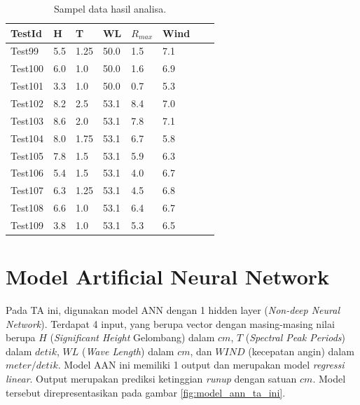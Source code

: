   \begin{table}
      \begin{center}
        \begin{tabular}{|l|l|l|l|l|l|l|l|}
        \hline
        TestId & H & T & WL & $R_{max}$ & Wind \\ \hline
        Test99 & 5.5 & 1.25 & 50.0 & 1.5 & 7.1 \\ \hline
        Test100 & 6.0 & 1.0 & 50.0 & 1.6 & 6.9 \\ \hline
        Test101 & 3.3 & 1.0 & 50.0 & 0.7 & 5.3 \\ \hline
        Test102 & 8.2 & 2.5 & 53.1 & 8.4 & 7.0 \\ \hline
        Test103 & 8.6 & 2.0 & 53.1 & 7.8 & 7.1 \\ \hline
        Test104 & 8.0 & 1.75 & 53.1 & 6.7 & 5.8 \\ \hline
        Test105 & 7.8 & 1.5 & 53.1 & 5.9 & 6.3 \\ \hline
        Test106 & 5.4 & 1.5 & 53.1 & 4.0 & 6.7 \\ \hline
        Test107 & 6.3 & 1.25 & 53.1 & 4.5 & 6.8 \\ \hline
        Test108 & 6.6 & 1.0 & 53.1 & 6.4 & 6.7 \\ \hline
        Test109 & 3.8 & 1.0 & 53.1 & 5.3 & 6.5 \\ \hline
        \end{tabular}
      \end{center}
      \caption{Sampel data hasil analisa.}
      \label{tabel:sampel_analisa}
    \end{table}
  \FloatBarrier

\section{Model Artificial Neural Network}
  Pada TA ini, digunakan model ANN dengan 1 hidden layer (\emph{Non-deep Neural Network}). Terdapat 4 input, yang berupa vector dengan masing-masing nilai berupa $H$ (\emph{Significant Height} Gelombang) dalam $cm$, $T$ (\emph{Spectral Peak Periods}) dalam $detik$, $WL$ (\emph{Wave Length}) dalam $cm$, dan $WIND$ (kecepatan angin) dalam $meter/detik$. Model AAN ini memiliki 1 output dan merupakan model \emph{regressi linear}. Output merupakan prediksi ketinggian \emph{runup} dengan satuan $cm$. Model tersebut direpresentasikan pada gambar \ref{fig:model_ann_ta_ini}.


